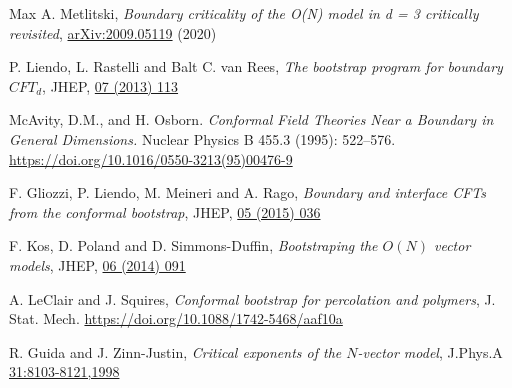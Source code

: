 \documentclass[a4paper,11pt]{article}
\begin{document}
\begin{thebibliography}{99}


Max A. Metlitski,
\emph{Boundary criticality of the O(N) model in d = 3 critically revisited},
\href{https://arxiv.org/abs/2009.05119}{arXiv:2009.05119} (2020)

P. Liendo, L. Rastelli and Balt C. van Rees,
\emph{The bootstrap program for boundary $CFT_d$}, JHEP, \href{https://link.springer.com/article/10.1007/JHEP07(2013)113}{07 (2013) 113}

McAvity, D.M., and H. Osborn. \emph{Conformal Field Theories Near a Boundary in General Dimensions.} Nuclear Physics B 455.3 (1995): 522–576. \url{https://doi.org/10.1016/0550-3213(95)00476-9}

F. Gliozzi, P. Liendo, M. Meineri and A. Rago, \emph{Boundary and interface CFTs from the conformal bootstrap}, JHEP, \href{https://link.springer.com/article/10.1007/JHEP05(2015)036}{05 (2015) 036}

F. Kos, D. Poland and D. Simmons-Duffin, \emph{Bootstraping the $O(N)$ vector models}, JHEP, \href{https://doi.org/10.1007/JHEP06(2014)091}{ 06 (2014) 091}

A. LeClair and J. Squires, \emph{Conformal bootstrap for percolation and polymers}, J. Stat. Mech. \url{https://doi.org/10.1088/1742-5468/aaf10a}

R. Guida and J. Zinn-Justin, \emph{Critical exponents of the $N$-vector model}, J.Phys.A \href{https://iopscience.iop.org/article/10.1088/0305-4470/31/40/006}{31:8103-8121,1998} 






\end{thebibliography}
\end{document}
